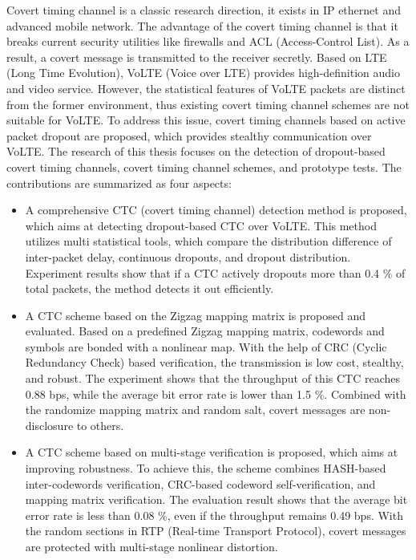 \begin{englishabstract}

   Covert timing channel is a classic research direction, it exists in IP ethernet and advanced mobile network. The advantage of the covert timing channel is that it breaks current security utilities like firewalls and ACL (Access-Control List). As a result, a covert message is transmitted to the receiver secretly. Based on LTE (Long Time Evolution), VoLTE (Voice over LTE) provides high-definition audio and video service. However, the statistical features of VoLTE packets are distinct from the former environment, thus existing covert timing channel schemes are not suitable for VoLTE. To address this issue, covert timing channels based on active packet dropout are proposed, which provides stealthy communication over VoLTE. The research of this thesis focuses on the detection of dropout-based covert timing channels, covert timing channel schemes, and prototype tests. The contributions are summarized as four aspects:

\begin{itemize}

   \item A comprehensive CTC (covert timing channel) detection method is proposed, which aims at detecting dropout-based CTC over VoLTE. This method utilizes multi statistical tools, which compare the distribution difference of inter-packet delay, continuous dropouts, and dropout distribution. Experiment results show that if a CTC actively dropouts more than 0.4 \% of total packets, the method detects it out efficiently.

   \item A CTC scheme based on the Zigzag mapping matrix is proposed and evaluated. Based on a predefined Zigzag mapping matrix, codewords and symbols are bonded with a nonlinear map. With the help of CRC (Cyclic Redundancy Check) based verification, the transmission is low cost, stealthy, and robust. The experiment shows that the throughput of this CTC reaches 0.88 bps, while the average bit error rate is lower than 1.5 \%. Combined with the randomize mapping matrix and random salt, covert messages are non-disclosure to others.

   \item A CTC scheme based on multi-stage verification is proposed, which aims at improving robustness. To achieve this, the scheme combines HASH-based inter-codewords verification, CRC-based codeword self-verification, and mapping matrix verification. The evaluation result shows that the average bit error rate is less than 0.08 \%, even if the throughput remains 0.49 bps. With the random sections in RTP (Real-time Transport Protocol), covert messages are protected with multi-stage nonlinear distortion.


\end{itemize}
\end{englishabstract}
